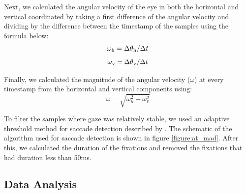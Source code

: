 Next, we calculated the angular velocity of the eye in both the horizontal and vertical coordinated by taking a first difference of the angular velocity and dividing by the difference between the timestamp of the samples using the formula below:
\begin{equation*}\label{eq:h_vel_angle}
    \omega\textsubscript{h} = \Delta\theta\textsubscript{h} / \Delta t
 \end{equation*}  
 \begin{equation*}\label{eq:v_vel_angle}
     \omega\textsubscript{v} = \Delta\theta\textsubscript{v} / \Delta t
 \end{equation*}  

Finally, we calculated the magnitude of the angular velocity ($\omega$) at every timestamp from the horizontal and vertical components using:
\begin{equation*}\label{eq:vel_angle}
     \omega = \sqrt{\omega_h^2 + \omega_v^2}
 \end{equation*}  

To filter the samples where gaze was relatively stable, we used an adaptive threshold method for saccade detection described by \citet{Voloh2019-oc}. The schematic of the algorithm used for saccade detection is shown in figure \ref{figure:at_mad}. After this, we calculated the duration of the fixations and removed the fixations that had duration less than 50ms.

\subsection{Data Analysis}\label{sec:data_analysis}
